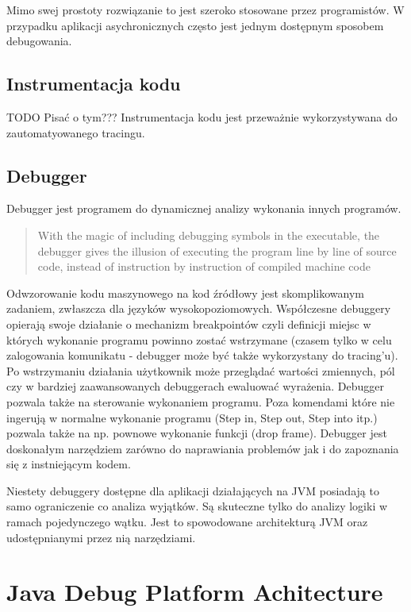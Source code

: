 Mimo swej prostoty rozwiązanie to jest szeroko stosowane przez programistów. W przypadku aplikacji asychronicznych często jest jednym dostępnym sposobem debugowania. 

\subsection{Instrumentacja kodu}

TODO Pisać o tym???
Instrumentacja kodu jest przeważnie wykorzystywana do zautomatyowanego tracingu.

\subsection{Debugger}
Debugger jest programem do dynamicznej analizy wykonania innych programów. 
\begin{quote}
    With the magic of including debugging symbols in the executable, the debugger gives the illusion of executing the program line by line of source code, instead of instruction by instruction of compiled machine code~\cite{artOfDebugging}
\end{quote}
Odwzorowanie kodu maszynowego na kod źródłowy jest skomplikowanym zadaniem, zwłaszcza dla języków wysokopoziomowych. Współczesne debuggery opierają swoje działanie o mechanizm breakpointów czyli definicji miejsc w których wykonanie programu powinno zostać wstrzymane (czasem tylko w celu zalogowania komunikatu - debugger może być także wykorzystany do tracing'u). Po wstrzymaniu działania użytkownik może przeglądać wartości zmiennych, pól czy w bardziej zaawansowanych debuggerach ewaluować wyrażenia.
Debugger pozwala także na sterowanie wykonaniem programu. Poza komendami które nie ingerują w normalne wykonanie programu (Step in, Step out, Step into itp.) pozwala także na np. pownowe wykonanie funkcji (drop frame). Debugger jest doskonałym narzędziem zarówno do naprawiania problemów jak i do zapoznania się z instniejącym kodem.



Niestety debuggery dostępne dla aplikacji działających na JVM posiadają to samo ograniczenie co   analiza wyjątków. Są skuteczne tylko do analizy logiki w ramach pojedynczego wątku. Jest to spowodowane architekturą JVM oraz udostępnianymi przez nią narzędziami.


\section{Java Debug Platform Achitecture}


